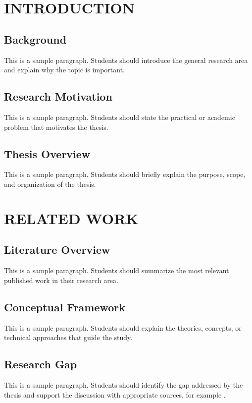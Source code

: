 \documentclass[12pt,fleqn]{report}
\begin{document}
\chapter{INTRODUCTION}

\section{Background}
This is a sample paragraph. Students should introduce the general research area and explain why the topic is important.

\section{Research Motivation}
This is a sample paragraph. Students should state the practical or academic problem that motivates the thesis.

\section{Thesis Overview}
This is a sample paragraph. Students should briefly explain the purpose, scope, and organization of the thesis.
\par
\chapter{RELATED WORK}

\section{Literature Overview}
This is a sample paragraph. Students should summarize the most relevant published work in their research area.

\section{Conceptual Framework}
This is a sample paragraph. Students should explain the theories, concepts, or technical approaches that guide the study.

\section{Research Gap}
This is a sample paragraph. Students should identify the gap addressed by the thesis and support the discussion with appropriate sources, for example \cite{lamport1994latex}.
\par
\end{document}
